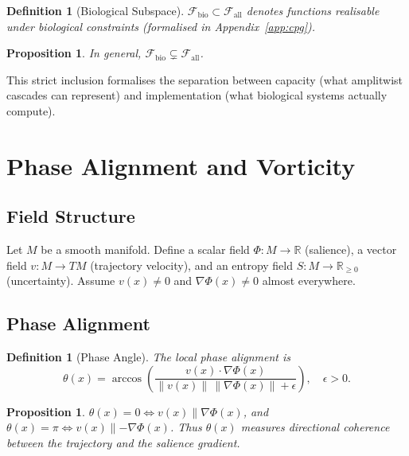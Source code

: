 \documentclass[12pt, a4paper]{article}
\newtheorem{definition}[theorem]{Definition}
\newtheorem{proposition}[theorem]{Proposition}
\theoremstyle{remark}
\theoremstyle{definition}
\begin{document}
\begin{definition}[Biological Subspace]
$\mathcal{F}_{\mathrm{bio}} \subset \mathcal{F}_{\mathrm{all}}$ denotes functions realisable
under biological constraints (formalised in Appendix~\ref{app:cpg}).
\end{definition}

\begin{proposition}
In general, $\mathcal{F}_{\mathrm{bio}} \subsetneq \mathcal{F}_{\mathrm{all}}$.
\end{proposition}

This strict inclusion formalises the separation between capacity (what amplitwist cascades
can represent) and implementation (what biological systems actually compute).

\section{Phase Alignment and Vorticity}
\label{app:phase}

\subsection{Field Structure}

Let $M$ be a smooth manifold.  Define a scalar field $\Phi \colon M \to \mathbb{R}$
(salience), a vector field $v \colon M \to TM$ (trajectory velocity), and an entropy
field $S \colon M \to \mathbb{R}_{\ge 0}$ (uncertainty).  Assume $v(x) \neq 0$ and
$\nabla\Phi(x) \neq 0$ almost everywhere.

\subsection{Phase Alignment}

\begin{definition}[Phase Angle]
The local phase alignment is
\[
\theta(x)
= \arccos\!\left(
\frac{v(x)\cdot\nabla\Phi(x)}
{\|v(x)\|\,\|\nabla\Phi(x)\|+\epsilon}
\right), \quad \epsilon > 0.
\]
\end{definition}

\begin{proposition}
$\theta(x) = 0 \iff v(x) \parallel \nabla\Phi(x)$, and
$\theta(x) = \pi \iff v(x) \parallel -\nabla\Phi(x)$.
Thus $\theta(x)$ measures directional coherence between the trajectory and the salience
gradient.
\end{proposition}
\end{document}
